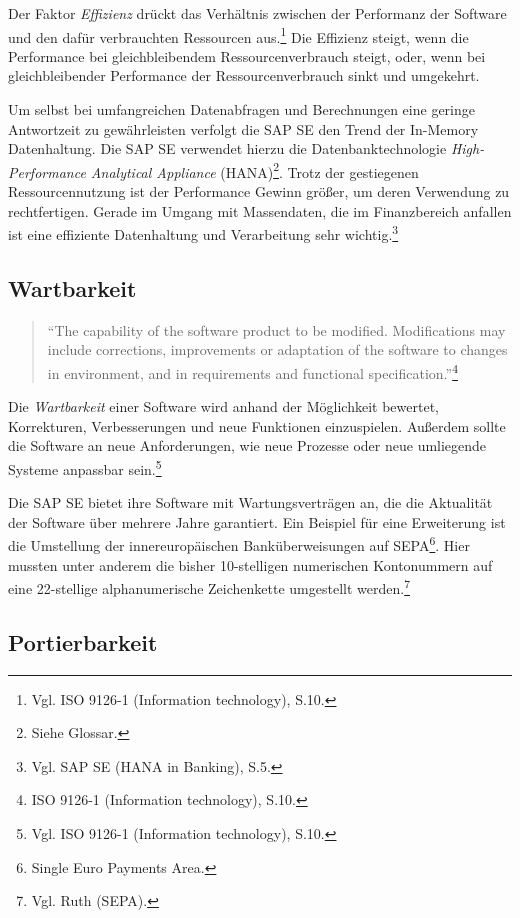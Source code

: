             Der Faktor \emph{Effizienz} drückt das Verhältnis zwischen der Performanz der Software und den dafür verbrauchten Ressourcen aus.\footnote{Vgl. ISO 9126-1 (Information technology), S.10.} Die Effizienz steigt, wenn die Performance bei gleichbleibendem Ressourcenverbrauch steigt, oder, wenn bei gleichbleibender Performance der Ressourcenverbrauch sinkt und umgekehrt.

            Um selbst bei umfangreichen Datenabfragen und Berechnungen eine geringe Antwortzeit zu gewährleisten verfolgt die SAP SE den Trend der In-Memory Datenhaltung. Die SAP SE verwendet hierzu die Datenbanktechnologie \emph{High-Performance Analytical Appliance} (HANA)\footnote{Siehe Glossar.}. Trotz der gestiegenen Ressourcennutzung ist der Performance Gewinn größer, um deren Verwendung zu rechtfertigen. Gerade im Umgang mit Massendaten, die im Finanzbereich anfallen ist eine effiziente Datenhaltung und Verarbeitung sehr wichtig.\footnote{Vgl. SAP SE (HANA in Banking), S.5.}

        \subsection{Wartbarkeit}

            \begin{quote}
              \enquote{The capability of the software product to be modified. Modifications may include corrections, improvements or adaptation of the software to changes in environment, and in requirements and functional specification.}\footnote{ISO 9126-1 (Information technology), S.10.}
            \end{quote}

            Die \emph{Wartbarkeit} einer Software wird anhand der Möglichkeit bewertet, Korrekturen, Verbesserungen und neue Funktionen einzuspielen. Außerdem sollte die Software an neue Anforderungen, wie neue Prozesse oder neue umliegende Systeme anpassbar sein.\footnote{Vgl. ISO 9126-1 (Information technology), S.10.}

            Die SAP SE bietet ihre Software mit Wartungsverträgen an, die die Aktualität der Software über mehrere Jahre garantiert. Ein Beispiel für eine Erweiterung ist die Umstellung der innereuropäischen Banküberweisungen auf SEPA\footnote{Single Euro Payments Area.}. Hier mussten unter anderem die bisher 10-stelligen numerischen Kontonummern auf eine 22-stellige alphanumerische Zeichenkette umgestellt werden.\footnote{Vgl. Ruth (SEPA).}

        \subsection{Portierbarkeit}

